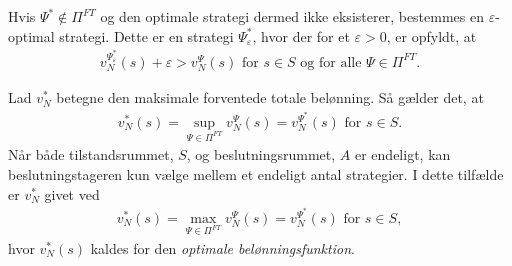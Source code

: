 Hvis $\Psi^* \not\in \Pi^{FT}$ og den optimale strategi dermed ikke eksisterer, bestemmes en $\varepsilon$-optimal strategi. Dette er en strategi $\Psi^*_\varepsilon$, hvor der for et $\varepsilon>0$, er opfyldt, at 
\begin{align*}
    v_N^{\Psi^*_\varepsilon}(s)+\varepsilon>v_N^\Psi(s) \text{ for } s\in S \text{ og for alle } \Psi \in \Pi^{FT}.
\end{align*}

Lad $v_N^*$ betegne den maksimale forventede totale belønning. Så gælder det, at
%
\begin{align}\label{eq:v_N=sup}
    v_N^*(s)=\sup_{\Psi\in \Pi^{FT}} v_N^{\Psi}(s)=v_N^{\Psi^*}(s) \text{ for }  s\in S.
\end{align}
Når både tilstandsrummet, $S$, og beslutningsrummet, $A$ er endeligt, kan beslutningstageren kun vælge mellem et endeligt antal strategier. I dette tilfælde er $v_N^*$ givet ved
\begin{align*}
    v_N^*(s)=\max_{\Psi\in \Pi^{FT}} v_N^{\Psi}(s)=v_N^{\Psi^*}(s) \text{ for }  s\in S,
\end{align*}
hvor $v_N^*(s)$ kaldes for den \textit{optimale belønningsfunktion}.








